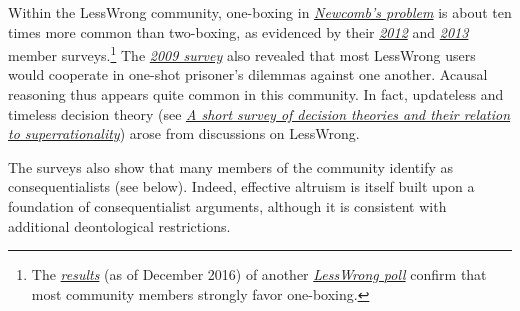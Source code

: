 Within the LessWrong community, one-boxing in
\href{https://en.wikipedia.org/wiki/Newcomb\%27s_paradox}{\emph{Newcomb's
problem}} is about ten times more common than two-boxing, as evidenced
by their
\href{http://lesswrong.com/lw/fp5/2012_survey_results/}{\emph{2012}} and
\href{http://lesswrong.com/lw/jj0/2013_survey_results/}{\emph{2013}}
member surveys.\footnote{The
  \href{https://casparoesterheld.files.wordpress.com/2016/12/newcombpayoffratiosurveydec2016.jpeg}{\emph{results}}
  (as of December 2016) of another
  \href{http://lesswrong.com/r/discussion/lw/hpy/normative_uncertainty_in_newcombs_problem/969i}{\emph{LessWrong
  poll}} confirm that most community members strongly favor one-boxing.}
The \href{http://lesswrong.com/lw/fk/survey_results/}{\emph{2009
survey}} also revealed that most LessWrong users would cooperate in
one-shot prisoner's dilemmas against one another. Acausal reasoning thus
appears quite common in this community. In fact, updateless and timeless
decision theory (see
\protect\hyperlink{a-short-survey-of-decision-theories-and-their-relation-to-superrationality}{\emph{A
short survey of decision theories and their relation to
superrationality}}) arose from discussions on LessWrong.

The surveys also show that many members of the community identify as
consequentialists (see below). Indeed, effective altruism is itself
built upon a foundation of consequentialist arguments, although it is
consistent with additional deontological restrictions.

